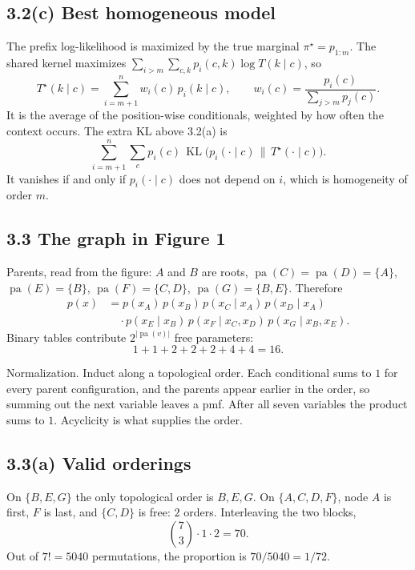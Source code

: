 \documentclass[11pt]{article}
\theoremstyle{remark}
\newcommand{\KL}{\operatorname{KL}}
\newcommand{\pa}{\operatorname{pa}}
\begin{document}
\subsection*{3.2(c) Best homogeneous model}

The prefix log-likelihood is maximized by the true marginal \(\pi^\star=p_{1:m}\). The shared kernel maximizes \(\sum_{i>m}\sum_{c,k}p_i(c,k)\log T(k\mid c)\), so
\[
T^\star(k\mid c)
=\sum_{i=m+1}^n w_i(c)\,p_i(k\mid c),
\qquad
w_i(c)=\frac{p_i(c)}{\sum_{j>m}p_j(c)}.
\]
It is the average of the position-wise conditionals, weighted by how often the context occurs. The extra KL above 3.2(a) is
\[
\sum_{i=m+1}^n\sum_c p_i(c)\,\KL\big(p_i(\cdot\mid c)\,\|\,T^\star(\cdot\mid c)\big).
\]
It vanishes if and only if \(p_i(\cdot\mid c)\) does not depend on \(i\), which is homogeneity of order \(m\).

\subsection*{3.3 The graph in Figure 1}

Parents, read from the figure: \(A\) and \(B\) are roots, \(\pa(C)=\pa(D)=\{A\}\), \(\pa(E)=\{B\}\), \(\pa(F)=\{C,D\}\), \(\pa(G)=\{B,E\}\). Therefore
\begin{align*}
p(x)&=p(x_A)\,p(x_B)\,p(x_C\mid x_A)\,p(x_D\mid x_A)\\
&\quad\cdot p(x_E\mid x_B)\,p(x_F\mid x_C,x_D)\,p(x_G\mid x_B,x_E).
\end{align*}
Binary tables contribute \(2^{|\pa(v)|}\) free parameters:
\[
1+1+2+2+2+4+4=16.
\]

Normalization. Induct along a topological order. Each conditional sums to \(1\) for every parent configuration, and the parents appear earlier in the order, so summing out the next variable leaves a pmf. After all seven variables the product sums to \(1\). Acyclicity is what supplies the order.

\subsection*{3.3(a) Valid orderings}

On \(\{B,E,G\}\) the only topological order is \(B,E,G\). On \(\{A,C,D,F\}\), node \(A\) is first, \(F\) is last, and \(\{C,D\}\) is free: \(2\) orders. Interleaving the two blocks,
\[
\binom{7}{3}\cdot 1\cdot 2=70.
\]
Out of \(7!=5040\) permutations, the proportion is \(70/5040=1/72\).
\end{document}
